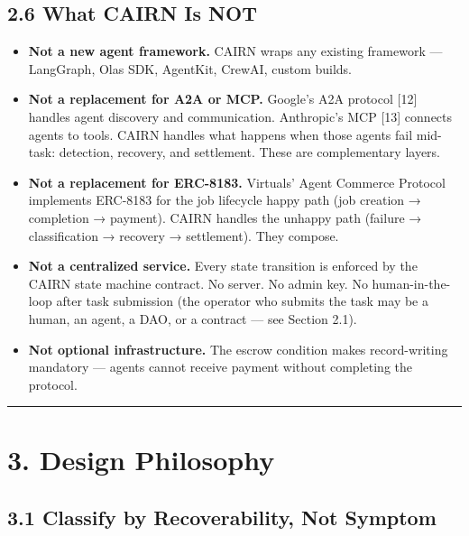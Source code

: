 \documentclass[
  10pt,
]{article}
\providecommand{\tightlist}{%
  \setlength{\itemsep}{0pt}\setlength{\parskip}{0pt}}
\begin{document}
\hypertarget{what-cairn-is-not}{%
\subsection{2.6 What CAIRN Is NOT}\label{what-cairn-is-not}}

\begin{itemize}
\tightlist
\item
  \textbf{Not a new agent framework.} CAIRN wraps any existing framework
  --- LangGraph, Olas SDK, AgentKit, CrewAI, custom builds.
\item
  \textbf{Not a replacement for A2A or MCP.} Google's A2A protocol
  {[}12{]} handles agent discovery and communication. Anthropic's MCP
  {[}13{]} connects agents to tools. CAIRN handles what happens when
  those agents fail mid-task: detection, recovery, and settlement. These
  are complementary layers.
\item
  \textbf{Not a replacement for ERC-8183.} Virtuals' Agent Commerce
  Protocol implements ERC-8183 for the job lifecycle happy path (job
  creation → completion → payment). CAIRN handles the unhappy path
  (failure → classification → recovery → settlement). They compose.
\item
  \textbf{Not a centralized service.} Every state transition is enforced
  by the CAIRN state machine contract. No server. No admin key. No
  human-in-the-loop after task submission (the operator who submits the
  task may be a human, an agent, a DAO, or a contract --- see Section
  2.1).
\item
  \textbf{Not optional infrastructure.} The escrow condition makes
  record-writing mandatory --- agents cannot receive payment without
  completing the protocol.
\end{itemize}

\begin{center}\rule{0.5\linewidth}{0.5pt}\end{center}

\hypertarget{design-philosophy}{%
\section{3. Design Philosophy}\label{design-philosophy}}

\hypertarget{classify-by-recoverability-not-symptom}{%
\subsection{3.1 Classify by Recoverability, Not
Symptom}\label{classify-by-recoverability-not-symptom}}
\end{document}
